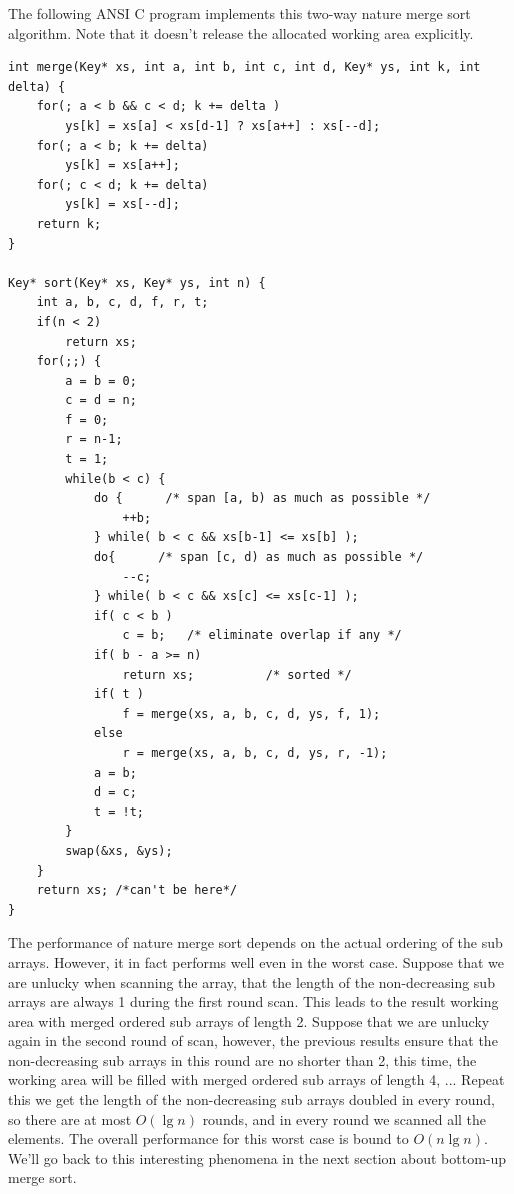 \documentclass[b5paper]{article}
\begin{document}
The following ANSI C program implements this two-way nature merge sort algorithm. Note that it
doesn't release the allocated working area explicitly.

\lstset{language=C}
\begin{lstlisting}
int merge(Key* xs, int a, int b, int c, int d, Key* ys, int k, int delta) {
    for(; a < b && c < d; k += delta )
        ys[k] = xs[a] < xs[d-1] ? xs[a++] : xs[--d];
    for(; a < b; k += delta)
        ys[k] = xs[a++];
    for(; c < d; k += delta)
        ys[k] = xs[--d];
    return k;
}

Key* sort(Key* xs, Key* ys, int n) {
    int a, b, c, d, f, r, t;
    if(n < 2)
        return xs;
    for(;;) {
        a = b = 0;
        c = d = n;
        f = 0;
        r = n-1;
        t = 1;
        while(b < c) {
            do {      /* span [a, b) as much as possible */
                ++b;
            } while( b < c && xs[b-1] <= xs[b] );
            do{      /* span [c, d) as much as possible */
                --c;
            } while( b < c && xs[c] <= xs[c-1] );
            if( c < b )
                c = b;   /* eliminate overlap if any */
            if( b - a >= n)
                return xs;          /* sorted */
            if( t )
                f = merge(xs, a, b, c, d, ys, f, 1);
            else
                r = merge(xs, a, b, c, d, ys, r, -1);
            a = b;
            d = c;
            t = !t;
        }
        swap(&xs, &ys);
    }
    return xs; /*can't be here*/
}
\end{lstlisting}

The performance of nature merge sort depends on the actual ordering of the sub arrays. However, it in fact performs
well even in the worst case. Suppose that we are unlucky when scanning the array, that the length of the non-decreasing
sub arrays are always 1 during the first round scan. This leads to the result working area with merged ordered sub
arrays of length 2. Suppose that we are unlucky again in the second round of scan, however, the previous results
ensure that the non-decreasing sub arrays in this round are no shorter than 2, this time, the working area will
be filled with merged ordered sub arrays of length 4, ... Repeat this we get the length of the non-decreasing sub arrays
doubled in every round, so there are at most $O(\lg n)$ rounds, and in every round we scanned all the elements.
The overall performance for this worst case is bound to $O(n \lg n)$. We'll go back to this interesting phenomena
in the next section about bottom-up merge sort.
\end{document}
